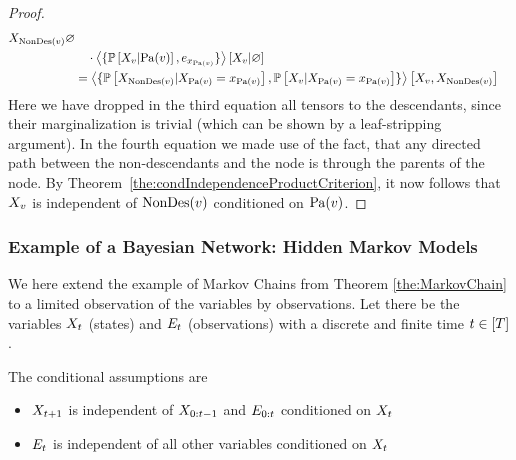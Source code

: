 \begin{proof}
\begin{align*}
{		}
		{X_{\mathrm{NonDes}(v)}}
		{\varnothing}   \\
		& \quad  \cdot \left\langle 
			\{\mathbb{P}\left[X_{v}|\mathrm{Pa}(v)\right],e_{x_{\mathrm{Pa}(v)}}\}
		\right\rangle \left[ X_{v} | \varnothing \right] \\
		& = \left\langle \{
		\mathbb{P}\left[X_{\mathrm{NonDes}(v)}|X_{\mathrm{Pa}(v)}=x_{\mathrm{Pa}(v)}\right],
		\mathbb{P}\left[X_{v}|X_{\mathrm{Pa}(v)}=x_{\mathrm{Pa}(v)}\right]
		\}\right\rangle \left[ X_{v},X_{\mathrm{NonDes}(v)} \right]
	\end{align*}
	Here we have dropped in the third equation all tensors to the descendants, since their marginalization is trivial (which can be shown by a leaf-stripping argument).
	In the fourth equation we made use of the fact, that any directed path between the non-descendants and the node is through the parents of the node.
	By Theorem~\ref{the:condIndependenceProductCriterion}, it now follows that $X_{v}$ is independent of $\mathrm{NonDes}(v)$ conditioned on $\mathrm{Pa}(v)$.
\end{proof}



\subsubsection{Example of a Bayesian Network: Hidden Markov Models}

We here extend the example of Markov Chains from Theorem \ref{the:MarkovChain} to a limited observation of the variables by observations.
Let there be the variables $X_{t}$ (states) and $E_{t}$ (observations) with a discrete and finite time $t\in[T]$.

The conditional assumptions are 
\begin{itemize}
	\item $X_{t+1}$ is independent of $X_{0:t-1}$ and $E_{0:t}$ conditioned on $X_{t}$
	\item $E_{t}$ is independent of all other variables conditioned on $X_{t}$
\end{itemize}

